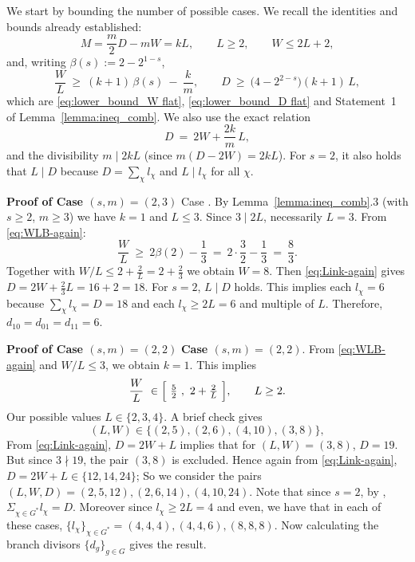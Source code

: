 \documentclass[12pt,twoside,]{amsart}
\theoremstyle{plain}
\theoremstyle{definition}
\begin{document}
We start by bounding the number of possible cases.  We recall the identities and bounds already established:
\[
M=\frac{m}{2}D-mW=kL,\qquad L\ge 2,\qquad W\le 2L+2,
\]
and, writing $\beta(s):=2-2^{1-s}$,
\begin{equation}
\label{eq:WLB-again}
\frac{W}{L}\ \ge\ (k+1)\,\beta(s)\ -\ \frac{k}{m},
\qquad
D\ \ge\ \bigl(4-2^{2-s}\bigr)(k+1)\,L,
\end{equation}
which are \eqref{eq:lower_bound_W flat}, \eqref{eq:lower_bound_D flat} and Statement~1 of Lemma~\ref{lemma:ineq_comb}.
We also use the exact relation
\begin{equation}
\label{eq:Link-again}
D\ =\ 2W+\frac{2k}{m}\,L,
\end{equation}
and the divisibility $m\mid 2kL$ (since $m(D-2W)=2kL$).
For $s=2$, it also holds that $L\mid D$ because $D=\sum_{\chi}l_\chi$ and $L\mid l_\chi$ for all $\chi$. 

\smallskip 

\noindent\textbf{Proof of Case $(s,m)=(2,3)$}\label{s = 2, m = 3}
Case . By Lemma~\ref{lemma:ineq_comb}.3 (with $s\ge 2$, $m\ge 3$) we have $k=1$ and $L\le 3$.
Since $3\mid 2L$, necessarily $L=3$. From \eqref{eq:WLB-again}:
\[
\frac{W}{L}\ \ge\ 2\beta(2)-\frac{1}{3}\ =\ 2\cdot\frac{3}{2}-\frac{1}{3}
\ =\ \frac{8}{3}.
\]
Together with $W/L\le 2+\frac{2}{L}=2+\frac{2}{3}$ we obtain $W=8$. Then \eqref{eq:Link-again} gives
$D=2W+\tfrac{2}{3}L=16+2=18$. For $s=2$, $L\mid D$ holds.
This implies each $l_\chi=6$ because $\sum_\chi l_\chi=D=18$ and each $l_\chi\ge 2L=6$ and multiple of $L$. Therefore,  $d_{10}=d_{01}=d_{11}=6$. 

\smallskip

\noindent\textbf{Proof of Case $(s,m)=(2,2)$}\label{s = 2, m = 2}
\textbf{Case $(s,m)=(2,2)$}. From \eqref{eq:WLB-again} and $W/L\le 3$, we obtain $k=1$.
This implies
\[
\frac{W}{L}\ \in\Bigl[\ \tfrac{5}{2}\ ,\ 2+\tfrac{2}{L}\ \Bigr],\qquad L\ge 2.
\]
Our possible values $L\in\{2,3,4\}$. A brief check gives
\[
(L,W)\in\{(2,5),(2,6),(4,10), (3,8)\},
\]
From \eqref{eq:Link-again}, $D = 2W+L$ implies that for $(L,W) = (3,8)$, $D = 19$. But since $3 \nmid 19$, the pair $(3,8)$ is excluded. Hence again from \eqref{eq:Link-again},
$D=2W+L\in\{12,14,24\}$; 
\color{black}
So we consider the pairs $(L,W,D) = (2,5,12), (2,6,14), (4,10,24)$. Note that since $s = 2$, by , $\Sigma_{\chi \in G^*} l_{\chi} = D$. Moreover since $l_{\chi} \geq 2L = 4$ and even, we have that in each of these cases, $\{l_{\chi}\}_{\chi \in G^*} = (4,4,4), (4,4,6), (8,8,8)$. Now calculating the branch divisors $\{d_g\}_{g \in G}$ gives the result. 
\end{document}
